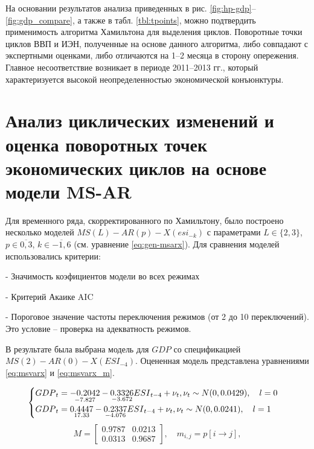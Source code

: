 \documentclass[a4paper,14pt]{extreport}
\begin{document}
	На основании результатов анализа приведенных в рис. \ref{fig:hp-gdp}–\ref{fig:gdp_compare}, а также в табл. \ref{tbl:tpoints}, можно подтвердить применимость алгоритма Хамильтона для выделения циклов. Поворотные точки циклов ВВП и ИЭН, полученные на основе данного алгоритма, либо совпадают с экспертными оценками, либо отличаются на 1–2 месяца в сторону опережения. Главное несоответствие  возникает в периоде 2011–2013 гг., который характеризуется высокой неопределенностью экономической конъюнктуры.
	
	
	\section{Анализ циклических изменений и оценка поворотных точек экономических циклов на основе модели MS-AR}
	
	Для временного ряда, скорректированного по Хамильтону, было построено несколько моделей $MS(L)-AR(p)-X(esi_{-k})$ с параметрами $L \in \{2,3\}$, $p \in \overline{0,3}$, $k \in \overline{-1,6}$ (см. уравнение \ref{eq:gen-msarx}). Для сравнения моделей использовались критерии:
	
	- Значимость коэфициентов модели во всех режимах
	
	- Критерий Акаике AIC
	
	- Пороговое значение частоты переключения режимов (от 2 до 10 переключений). Это условие – проверка на адекватность режимов.
	
	В результате была выбрана модель для ${GDP}$ со спецификацией $MS(2)-AR(0)-X({ESI}_{-4})$. Оцененная модель представлена уравнениями \ref{eq:msvarx} и \ref{eq:msvarx_m}.
	
	{
		
		\begin{equation}
		\label{eq:msvarx}
		\begin{cases}
		{GDP}_{t} = 
		\underset{-7.827}{-0.2042} 
		- \underset{-3.672}{0.3326} {ESI}_{t-4}
		+ \nu_{t} , \space \nu_{t} \sim N(0, 0.0429)
		, \quad l=0 \\
		{GDP}_{t} = 
		\underset{17.33}{0.4447}
		- \underset{-4.076}{0.2337} {ESI}_{t-4}
		+ \nu_{t} , \space \nu_{t} \sim N(0, 0.0241)
		, \quad l=1
		\end{cases}			
		\end{equation}
		\begin{equation}
		\label{eq:msvarx_m}
		M = 
		\begin{bmatrix}
		0.9787 & 0.0213 \\
		0.0313 & 0.9687
		\end{bmatrix}
		, \quad m_{i,j} = p[i \rightarrow j],
		\end{equation}
		
	}
	
\end{document}
